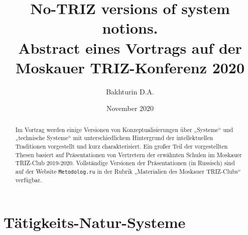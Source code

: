 \documentclass[11pt,a4paper]{article}
\title{No-TRIZ versions of system notions.\\[1em] \Large Abstract eines
  Vortrags auf der Moskauer TRIZ-Konferenz 2020}
\author{Bakhturin D.A.}
\date{November 2020}
\begin{document}
\maketitle
\tableofcontents

\begin{abstract}
  Im Vortrag werden einige Versionen von Konzeptualisierungen über „Systeme“
  und „technische Systeme“ mit unterschiedlichem Hintergrund der
  intellektuellen Traditionen vorgestellt und kurz charakterisiert. Ein großer
  Teil der vorgestellten Thesen basiert auf Präsentationen von Vertretern der
  erwähnten Schulen im Moskauer TRIZ-Club 2019-2020. Vollständige Versionen
  der Präsentationen (in Russisch) sind auf der Website \texttt{Metodolog.ru}
  in der Rubrik „Materialien des Moskauer TRIZ-Clubs“ verfügbar.
\end{abstract}

\section{Tätigkeits-Natur-Systeme}
\end{document}
